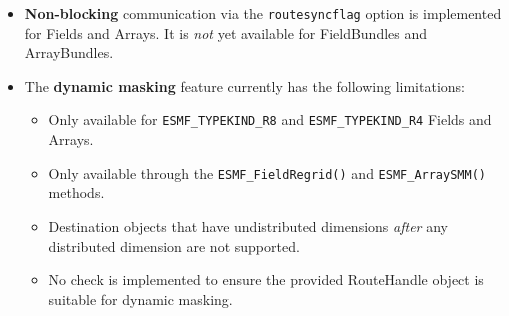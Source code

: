 
\begin{itemize}

\item {\bf Non-blocking} communication via the {\tt routesyncflag} option is implemented for Fields and Arrays. It is {\em not} yet available for FieldBundles and ArrayBundles.

\item The {\bf dynamic masking} feature currently has the following limitations:

\begin{itemize}

\item Only available for {\tt ESMF\_TYPEKIND\_R8} and {\tt ESMF\_TYPEKIND\_R4} Fields and Arrays.

\item Only available through the {\tt ESMF\_FieldRegrid()} and {\tt ESMF\_ArraySMM()} methods.

\item Destination objects that have undistributed dimensions {\em after} any distributed dimension are not supported.

\item No check is implemented to ensure the provided RouteHandle object is suitable for dynamic masking.

\end{itemize}


\end{itemize}
